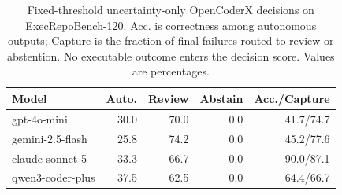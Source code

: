 \begin{table}[t]
\centering
\small
\caption{Fixed-threshold uncertainty-only OpenCoderX decisions on ExecRepoBench-120. Acc. is correctness among autonomous outputs; Capture is the fraction of final failures routed to review or abstention. No executable outcome enters the decision score. Values are percentages.}
\label{tab:selective_autonomy}
\begin{tabular}{lrrrr}
\toprule
Model & Auto. & Review & Abstain & Acc./Capture \\
\midrule
gpt-4o-mini & 30.0 & 70.0 & 0.0 & 41.7/74.7 \\
gemini-2.5-flash & 25.8 & 74.2 & 0.0 & 45.2/77.6 \\
claude-sonnet-5 & 33.3 & 66.7 & 0.0 & 90.0/87.1 \\
qwen3-coder-plus & 37.5 & 62.5 & 0.0 & 64.4/66.7 \\
\bottomrule
\end{tabular}
\end{table}
